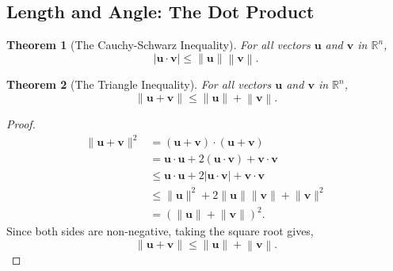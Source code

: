 \documentclass{article}
\newtheorem*{theorem*}{Theorem}
\begin{document}
\subsection{Length and Angle: The Dot Product}
\begin{theorem*}[The Cauchy-Schwarz Inequality]
  For all vectors $\mathbf{u}$ and $\mathbf{v}$ in $\mathbb{R}^n$,
  \[|\mathbf{u}\cdot\mathbf{v}|\le\left\|\mathbf{u}\right\|\left\|\mathbf{v}\right\|.\]
\end{theorem*}
\begin{theorem*}[The Triangle Inequality]
  For all vectors $\mathbf{u}$ and $\mathbf{v}$ in $\mathbb{R}^n$,
  \[\lVert\mathbf{u}+\mathbf{v}\rVert\le\left\|\mathbf{u}\right\|+\left\|\mathbf{v}\right\|.\]
\end{theorem*}
\begin{proof}
  \begin{align*}
    \lVert\mathbf{u}+\mathbf{v}\rVert^2 & = (\mathbf{u}+\mathbf{v})\cdot(\mathbf{u}+\mathbf{v}) \\
    & = \mathbf{u}\cdot\mathbf{u} +
    2(\mathbf{u}\cdot\mathbf{v}) + \mathbf{v}\cdot\mathbf{v}                                    \\
    & \le \mathbf{u}\cdot\mathbf{u} +
    2\left|\mathbf{u}\cdot\mathbf{v}\right| + \mathbf{v}\cdot\mathbf{v}                         \\
    & \le \lVert\mathbf{u}\rVert^2 +
    2\lVert\mathbf{u}\rVert\lVert\mathbf{v}\rVert + \lVert\mathbf{v}\rVert^2                    \\
    & =
    \left(\lVert\mathbf{u}\rVert+\lVert\mathbf{v}\rVert\right)^2.
  \end{align*}
  Since both sides are non-negative, taking the square root gives,
  \[\lVert\mathbf{u}+\mathbf{v}\rVert\le\left\|\mathbf{u}\right\|+\left\|\mathbf{v}\right\|.\]
\end{proof}
\end{document}
